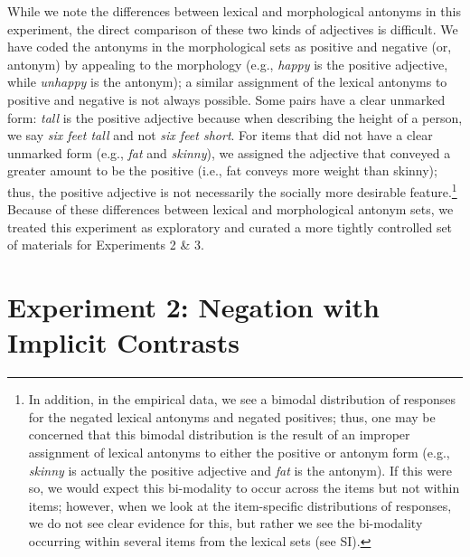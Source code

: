 \documentclass[floatsintext,doc]{apa6}
\let\rmarkdownfootnote\footnote%
\def\footnote{\protect\rmarkdownfootnote}
\begin{document}
While we note the differences between lexical and morphological antonyms in this experiment, the direct comparison of these two kinds of adjectives is difficult. 
We have coded the antonyms in the morphological sets as positive and negative (or, antonym) by appealing to the morphology (e.g., \emph{happy} is the positive adjective, while \emph{unhappy} is the antonym); a similar assignment of the lexical antonyms to positive and negative is not always possible.
Some pairs have a clear unmarked form: \emph{tall} is the positive adjective because when describing the height of a person, we say \emph{six feet tall} and not \emph{six feet short}.
For items that did not have a clear unmarked form (e.g., \emph{fat} and \emph{skinny}), we assigned the adjective that conveyed a greater amount to be the positive (i.e., fat conveys more weight than skinny); thus, the positive adjective is not necessarily the socially more desirable feature.\footnote{
In addition, in the empirical data, we see a bimodal distribution of responses for the negated lexical antonyms and negated positives; thus, one may be concerned that this bimodal distribution is the result of an improper assignment of lexical antonyms to either the positive or antonym form (e.g., \emph{skinny} is actually the positive adjective and \emph{fat} is the antonym). 
If this were so, we would expect this bi-modality to occur across the items but not within items; however, when we look at the item-specific distributions of responses, we do not see clear evidence for this, but rather we see the bi-modality occurring within several items from the lexical sets (see SI).
}
Because of these differences between lexical and morphological antonym sets, we treated this experiment as exploratory and curated a more tightly controlled set of materials for Experiments 2 \& 3.



\section{Experiment 2: Negation with Implicit Contrasts}\label{experiment-2-single-and-multiple-utterances}

\end{document}
